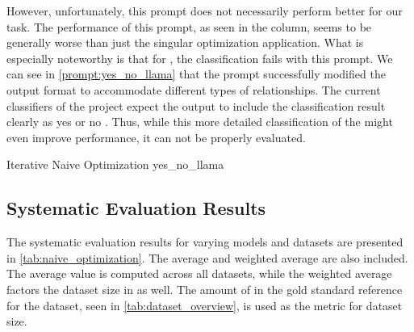 However, unfortunately, this prompt does not necessarily perform better for our task.
The performance of this prompt, as seen in the  column, seems to be generally worse than just the singular optimization application.
What is especially noteworthy is that for \llama, the classification fails with this prompt.
We can see in \autoref{prompt:yes_no_llama} that the prompt successfully modified the output format to accommodate different types of relationships.
The current classifiers of the \LiSSA project expect the \LLM output to include the classification result clearly as \textquotesingle yes \textquotesingle or \textquotesingle no \textquotesingle.
Thus, while this more detailed classification of the \LLM might even improve performance, it can not be properly evaluated.

\begin{prompt}{\KISS Iterative Naive Optimization \llama}{yes_no_llama}
    \\
    
\end{prompt}

\subsection{Systematic Evaluation Results}
\label{subsec:Evaluation:naive_optimization:systematic-evaluation-results}

The systematic evaluation results for varying models and datasets are presented in \autoref{tab:naive_optimization}.
The average and weighted average are also included.
The average value is computed across all datasets, while the weighted average factors the dataset size in as well.
The amount of \TLs in the gold standard reference for the dataset, seen in \autoref{tab:dataset_overview}, is used as the metric for dataset size.

\begin{table}
    \centering
    \renewcommand{\arraystretch}{1.4}
    
    \renewcommand{\arraystretch}{1}
    \caption{Naive prompt optimization approach prompting the model to optimize the classification prompt.
    }
    \label{tab:naive_optimization}
\end{table}

